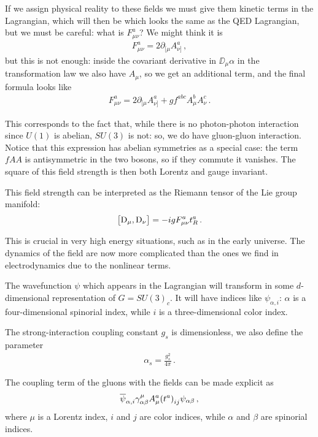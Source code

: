 \documentclass[main.tex]{subfiles}
\begin{document}
If we assign physical reality to these fields we must give them kinetic terms in the Lagrangian, which will then be 
%
%
which looks the same as the QED Lagrangian, but we must be careful: what is \(F_{\mu \nu }^{a}\)?
We might think it is 
%
\begin{align}
F^{a}_{\mu \nu } = 2 \partial_{[\mu } A^{a}_{\nu ]}
\,,
\end{align}
%
but this is not enough: inside the covariant derivative in \(\DD_{\mu } \alpha \) in the transformation law we also have \(A_{\mu }\), so we get an additional term, and the final formula looks like 
%
\begin{align}
F^{a}_{\mu \nu } = 2 \partial_{[\mu } A^{a}_{\nu ]} + g f^{abc} A^{b}_{\mu } A^{c}_{\nu }
\,.
\end{align}

This corresponds to the fact that, while there is no photon-photon interaction since \(U(1)\) is abelian,  \(SU(3)\) is not: so, we do have gluon-gluon interaction. 
Notice that this expression has abelian symmetries as a special case: the term \(fAA\) is antisymmetric in the two bosons, so if they commute it vanishes. 
The square of this field strength is then both Lorentz and gauge invariant.

This field strength can be interpreted as the Riemann tensor of the Lie group manifold: 
%
\begin{align}
\qty[\mathrm{D}_\mu , \mathrm{D}_\nu] = -ig F^{a}_{\mu \nu } t^{a}_{R}
\,.
\end{align}

This is crucial in very high energy situations, such as in the early universe. The dynamics of the field are now more complicated than the ones we find in electrodynamics due to the nonlinear terms.

The wavefunction \(\psi\) which appears in the Lagrangian will transform in some \(d\)-di\-men\-sio\-nal representation of \(G = SU(3)_c\). 
It will have indices like \(\psi_{\alpha , i}\): \(\alpha \) is a four-dimensional spinorial index, while \(i\) is a three-dimensional color index. 

The strong-interaction coupling constant \(g_s \) is dimensionless, we also define the parameter
%
\begin{align}
\alpha_{s} = \frac{g_s^2}{4 \pi }
\,.
\end{align}

The coupling term of the gluons with the fields can be made explicit as 
%
\begin{align}
\overline{\psi}_{\alpha, i} \gamma^{\mu }_{\alpha \beta } A^{a}_{\mu } \qty(t^{a})_{ij} \psi_{\alpha \beta }
\,,
\end{align}
%
where \(\mu \) is a Lorentz index, \(i\) and \(j\) are color indices, while \(\alpha \) and \(\beta \) are spinorial indices.
\end{document}
